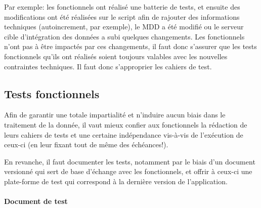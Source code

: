 \documentclass{book}
\newcommand{\myparagraph}[1]{\paragraph{#1}\mbox{}\\}
\begin{document}
Par exemple: les \gls{fonctionnels} ont réalisé une batterie de tests, et ensuite des modifications ont été réalisées sur le script afin de rajouter des informations techniques (autoincrement, par exemple), le MDD a été modifié ou le serveur cible d'intégration des données a subi quelques changements. Les \gls{fonctionnels} n'ont pas à être impactés par ces changements, il faut donc s'assurer que les tests fonctionnels qu'ils ont réalisés soient toujours valables avec les nouvelles contraintes techniques. Il faut donc s'approprier les cahiers de test.
	
\subsection{Tests fonctionnels}

Afin de garantir une totale impartialité et n'induire aucun biais dans le traitement de la donnée, il vaut mieux confier aux \gls{fonctionnels} la rédaction de leurs cahiers de tests et une certaine indépendance vis-à-vis de l'exécution de ceux-ci (en leur fixant tout de même des échéances!).

En revanche, il faut documenter les tests, notamment par le biais d'un document versionné qui sert de base d'échange avec les \gls{fonctionnels}, et offrir à ceux-ci une plate-forme de test qui correspond à la dernière version de l'application.
	
\myparagraph{Document de test}
\end{document}
